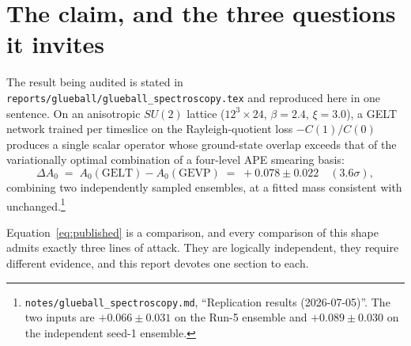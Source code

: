 \documentclass[11pt,a4paper]{article}
\newcommand{\Azero}{A_0}
\newcommand{\dAzero}{\Delta A_0}
\begin{document}
\tableofcontents

\section{The claim, and the three questions it invites}
\label{sec:intro}

The result being audited is stated in
\texttt{reports/glueball/glueball\_spectroscopy.tex} and reproduced here in one
sentence. On an anisotropic $SU(2)$ lattice ($12^3\times 24$, $\beta = 2.4$,
$\xi = 3.0$), a GELT network trained per timeslice on the Rayleigh-quotient loss
$-C(1)/C(0)$ produces a single scalar operator whose ground-state overlap
exceeds that of the variationally optimal combination of a four-level APE
smearing basis:
\begin{equation}
  \dAzero \;=\; \Azero(\text{GELT}) - \Azero(\text{GEVP})
  \;=\; +0.078 \pm 0.022 \quad (3.6\sigma),
  \label{eq:published}
\end{equation}
combining two independently sampled ensembles, at a fitted mass consistent with
unchanged.\footnote{\texttt{notes/glueball\_spectroscopy.md}, ``Replication
results (2026-07-05)''. The two inputs are $+0.066 \pm 0.031$ on the Run-5
ensemble and $+0.089 \pm 0.030$ on the independent seed-1 ensemble.}

Equation~\eqref{eq:published} is a comparison, and every comparison of this
shape admits exactly three lines of attack. They are logically independent, they
require different evidence, and this report devotes one section to each.
\end{document}

